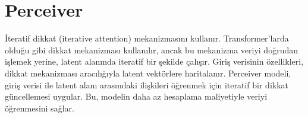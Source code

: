 \section{Perceiver}

İteratif dikkat (iterative attention) mekanizmasını kullanır. Transformer'larda olduğu gibi dikkat mekanizması kullanılır, ancak bu mekanizma veriyi doğrudan işlemek yerine, latent alanında iteratif bir şekilde çalışır. Giriş verisinin özellikleri, dikkat mekanizması aracılığıyla latent vektörlere haritalanır. Perceiver modeli, giriş verisi ile latent alanı arasındaki ilişkileri öğrenmek için iteratif bir dikkat güncellemesi uygular. Bu, modelin daha az hesaplama maliyetiyle veriyi öğrenmesini sağlar.

\newpage